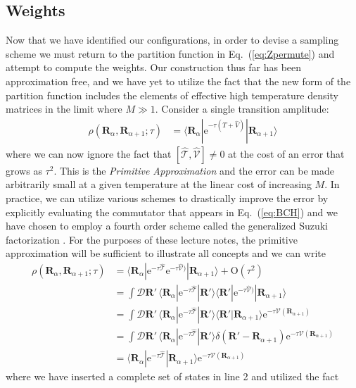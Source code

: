 \documentclass[prb,aps,amssym,nofootinbib,floatfix,notitlepage]{revtex4-1}
\renewcommand{\vec}[1]{\boldsymbol{#1}}
\newcommand{\e}[1]{\mathrm{e}^{#1}}
\renewcommand{\eqref}[1]{Eq.~(\ref{#1})}
\newcommand{\R}{\vec{R}}
\newcommand{\T}{\mathcal{T}}
\begin{document}
\subsection{Weights}
Now that we have identified our configurations, in order to devise a sampling
scheme we must return to the partition function in \eqref{eq:Zpermute} and
attempt to compute the weights.  Our construction thus far has been
approximation free, and we have yet to utilize the fact that the new form of
the partition function includes the elements of effective high temperature
density matrices in the limit where $M \gg 1$. Consider a single transition
amplitude:
%
\begin{align}
\rho(\R_\alpha, \R_{\alpha+1}; \tau) &= \langle \R_\alpha | \e{-\tau(\hat{T} +
\hat{V})}|\R_{\alpha+1}\rangle
\end{align}
%
where we can now ignore the fact that $[\hat{\mathcal{T}},\hat{\mathcal{V}}]
\ne 0$ at the cost of an error that grows as $\tau^2$.  This is the
\emph{Primitive Approximation} and the error can be made arbitrarily small at a
given temperature at the linear cost of increasing $M$.  In practice, we can
utilize various schemes to drastically improve the error by explicitly
evaluating the commutator that appears in \eqref{eq:BCH} and we have chosen to 
employ a fourth order scheme called the generalized Suzuki factorization
\cite{Jang:2001cl}. For the purposes of these lecture notes, the primitive
approximation will be sufficient to illustrate all concepts and we can write
%
\begin{align}
    \rho(\R_\alpha, \R_{\alpha+1}; \tau) &= \langle \R_\alpha | 
    \e{-\tau\hat{\mathcal{T}}} \e{-\tau\hat{\mathcal{V}})}|\R_{\alpha+1}\rangle + \mathrm{O}(\tau^2)
\nonumber \\
&= \int \mathcal{D}\R'\, \langle \R_\alpha | 
\e{-\tau\hat{\T}}|\R'\rangle \langle \R' | \e{-\tau\hat{\mathcal{V}})}|\R_{\alpha+1}\rangle 
\nonumber \\
&= \int \mathcal{D}\R'\, \langle \R_\alpha | 
\e{-\tau\hat{\T}}|\R'\rangle \langle \R' |\R_{\alpha+1}\rangle \e{-\tau
\mathcal{V}(\R_{\alpha+1})} \nonumber \\
&= \int \mathcal{D}\R'\, \langle \R_\alpha | 
\e{-\tau\hat{\T}}|\R'\rangle \delta (\R'-\R_{\alpha+1}) \e{-\tau
\mathcal{V}(\R_{\alpha+1})} \nonumber \\
&=  \langle \R_\alpha | \e{-\tau\hat{\T}}|\R_{\alpha+1}\rangle  \e{-\tau
\mathcal{V}(\R_{\alpha+1})} 
\label{eq:rhoPrimitive}
\end{align}
%
where we have inserted a complete set of states in line 2 and utilized the fact
\end{document}
